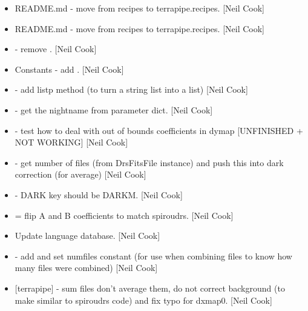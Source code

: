 \documentclass[a4paper,10pt,english]{report}
\begin{document}
\label{\detokenize{misc/changelog:id105}}\begin{itemize}
\item {} 
README.md - move from recipes to terrapipe.recipes. {[}Neil Cook{]}

\item {} 
README.md - move from recipes to terrapipe.recipes. {[}Neil Cook{]}

\item {} 
 - remove . {[}Neil Cook{]}

\item {} 
Constants - add . {[}Neil Cook{]}

\item {} 
 - add listp method (to turn a string list into a
list) {[}Neil Cook{]}

\item {} 
 - get the nightname from parameter dict. {[}Neil
Cook{]}

\item {} 
 - test how to deal with out of bounds
coefficients in dymap {[}UNFINISHED + NOT WORKING{]} {[}Neil Cook{]}

\item {} 
 - get number of files (from DrsFitsFile
instance) and push this into dark correction (for average) {[}Neil Cook{]}

\item {} 
 - DARK key should be DARKM. {[}Neil Cook{]}

\item {} 
 = flip A and B coefficients to
match spiroudrs. {[}Neil Cook{]}

\item {} 
Update language database. {[}Neil Cook{]}

\item {} 
 - add and set numfiles constant (for use when combining
files to know how many files were combined) {[}Neil Cook{]}

\item {} 
 {[}terrapipe{]} - sum files don’t average them,
do not correct background (to make similar to spiroudrs code) and fix
typo for dxmap0. {[}Neil Cook{]}


\end{itemize}
\end{document}
